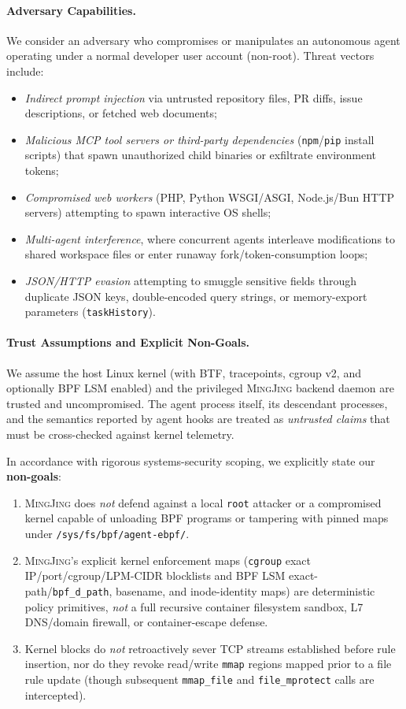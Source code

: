 \documentclass[10pt,twocolumn,letterpaper]{article}
\newcommand{\sys}{\textsc{MingJing}}
\newcommand{\code}[1]{\texttt{\small #1}}
\begin{document}
\paragraph{Adversary Capabilities.} We consider an adversary who compromises or manipulates an autonomous agent operating under a normal developer user account (non-root). Threat vectors include:
\begin{itemize}
  \item \emph{Indirect prompt injection} via untrusted repository files, PR diffs, issue descriptions, or fetched web documents;
  \item \emph{Malicious MCP tool servers or third-party dependencies} (\code{npm}/\code{pip} install scripts) that spawn unauthorized child binaries or exfiltrate environment tokens;
  \item \emph{Compromised web workers} (PHP, Python WSGI/ASGI, Node.js/Bun HTTP servers) attempting to spawn interactive OS shells;
  \item \emph{Multi-agent interference}, where concurrent agents interleave modifications to shared workspace files or enter runaway fork/token-consumption loops;
  \item \emph{JSON/HTTP evasion} attempting to smuggle sensitive fields through duplicate JSON keys, double-encoded query strings, or memory-export parameters (\code{taskHistory}).
\end{itemize}

\paragraph{Trust Assumptions and Explicit Non-Goals.} We assume the host Linux kernel (with BTF, tracepoints, cgroup v2, and optionally BPF LSM enabled) and the privileged \sys{} backend daemon are trusted and uncompromised. The agent process itself, its descendant processes, and the semantics reported by agent hooks are treated as \emph{untrusted claims} that must be cross-checked against kernel telemetry.

In accordance with rigorous systems-security scoping, we explicitly state our \textbf{non-goals}:
\begin{enumerate}
  \item \sys{} does \emph{not} defend against a local \code{root} attacker or a compromised kernel capable of unloading BPF programs or tampering with pinned maps under \code{/sys/fs/bpf/agent-ebpf/}.
  \item \sys{}'s explicit kernel enforcement maps (\code{cgroup} exact IP/port/cgroup/LPM-CIDR blocklists and BPF LSM exact-path/\code{bpf\_d\_path}, basename, and inode-identity maps) are deterministic policy primitives, \emph{not} a full recursive container filesystem sandbox, L7 DNS/domain firewall, or container-escape defense.
  \item Kernel blocks do \emph{not} retroactively sever TCP streams established before rule insertion, nor do they revoke read/write \code{mmap} regions mapped prior to a file rule update (though subsequent \code{mmap\_file} and \code{file\_mprotect} calls are intercepted).
\end{enumerate}
\end{document}
